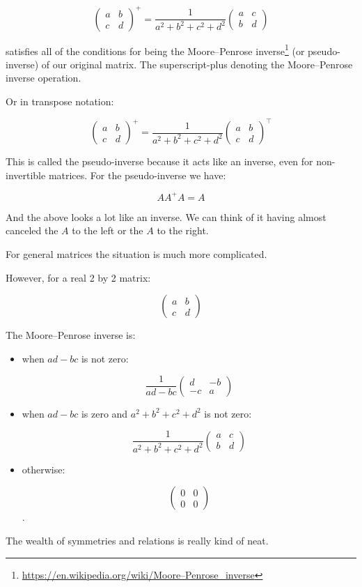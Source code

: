 \documentclass{article}
\begin{document}
\[ 
\begin{pmatrix} a & b \\ c & d \end{pmatrix}^{+}
=
\frac{1}{a^2 + b^2 + c^2 + d^2}
\begin{pmatrix} a & c \\ b & d \end{pmatrix}
\]

satisfies all of the conditions for being the Moore–Penrose inverse\footnote{\url{https://en.wikipedia.org/wiki/Moore–Penrose_inverse}} (or pseudo-inverse) of our original matrix.  The superscript-plus denoting the Moore–Penrose inverse operation.

Or in transpose notation:

\[ 
\begin{pmatrix} a & b \\ c & d \end{pmatrix}^{+}
=
\frac{1}{a^2 + b^2 + c^2 + d^2}
\begin{pmatrix} a & b \\ c & d \end{pmatrix}^{\top}
\]

This is called the pseudo-inverse because it acts like an inverse, even for non-invertible matrices.  For the pseudo-inverse we have:

\[
A A^{+} A = A
\]

And the above looks a lot like an inverse.  We can think of it having almost canceled the $A$ to the left or the $A$ to the right.

For general matrices the situation is much more complicated. 

However, for a real 2 by 2 matrix:

\[
\begin{pmatrix} a & b \\ c & d \end{pmatrix}
\]

The  Moore–Penrose inverse is:


\begin{itemize}


\item []when $a d - b c$ is not zero:

\[
\frac{1}{a d - b c}
\begin{pmatrix} d & -b \\ -c & a \end{pmatrix} 
\]

\item []when $a d - b c$ is zero and $a^2 + b^2 + c^2 + d^2$ is not zero:

\[ 
\frac{1}{a^2 + b^2 + c^2 + d^2}
\begin{pmatrix} a & c \\ b & d \end{pmatrix}
\]

\item []otherwise:

\[ 
\begin{pmatrix} 0 & 0 \\ 0 & 0 \end{pmatrix}
\]
.
\end{itemize}

The wealth of symmetries and relations is really kind of neat.
\end{document}
